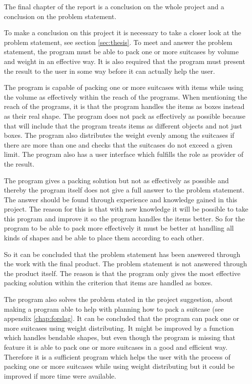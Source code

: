 The final chapter of the report is a conclusion on the whole project and a conclusion on the problem statement.

To make a conclusion on this project it is necessary to take a closer look at the problem statement, see section \ref{sec:thesis}. To meet and answer the problem statement, the program must be able to pack one or more suitcases by volume and weight in an effective way. It is also required that the program must present the result to the user in some way before it can actually help the user.

The program is capable of packing one or more suitcases with items while using the volume as effectively within the reach of the programs. When mentioning the reach of the programs, it is that the program handles the items as boxes instead as their real shape.
The program does not pack as effectively as possible because that will include that the program treats items as different objects and not just boxes. The program also distributes the weight evenly among the suitcases if there are more than one and checks that the suitcases do not exceed a given limit. The program also has a user interface which fulfills the role as provider of the result.

The program gives a packing solution but not as effectively as possible and thereby the program itself does not give a full answer to the problem statement. The answer should be found through experience and knowledge gained in this project. The reason for this is that with new knowledge it will be possible to take this program and improve it so the program handles the items better. So for the program to be able to pack more effectively it must be better at handling all kinds of shapes and be able to place them according to each other.

So it can be concluded that the problem statement has been answered through the work with the final product. The problem statement is not answered through the product itself. The reason is that the program only gives the most effective packing solution within the criterion that items are handled as boxes.

The program also solves the problem stated in the project suggestion, about making a program able to help with planning how to pack a suitcase (see appendix \ref{chap:forslag}. It can be concluded that the program can pack one or more suitcases using weight distributing. It might be improved by a function which handles bendable shapes, but even though the program is missing that feature it is able to pack one or more suitcases in a good and efficient way. Therefore it is a sufficient program which helps the user with the process of packing one or more suitcases while using weight distributing but it could be improved if more time were available.

